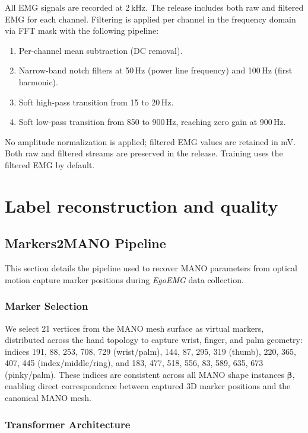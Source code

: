 \documentclass[letterpaper]{article} %
\newcommand{\dataset}{\textit{EgoEMG}}
\begin{document}
All EMG signals are recorded at 2\,kHz. The release includes both raw and filtered EMG for each channel. Filtering is applied per channel in the frequency domain via FFT mask with the following pipeline:
\begin{enumerate}[leftmargin=1.5em,nosep]
    \item Per-channel mean subtraction (DC removal).
    \item Narrow-band notch filters at 50\,Hz (power line frequency) and 100\,Hz (first harmonic).
    \item Soft high-pass transition from 15 to 20\,Hz.
    \item Soft low-pass transition from 850 to 900\,Hz, reaching zero gain at
    900\,Hz.
\end{enumerate}
No amplitude normalization is applied; filtered EMG values are retained in mV. Both raw and filtered streams are preserved in the release. Training uses the filtered EMG by default.

\FloatBarrier
\section{Label reconstruction and quality}
\label{app:label_validation}

\subsection{Markers2MANO Pipeline}
\label{app:markers2mano}

This section details the pipeline used to recover MANO parameters from optical motion capture marker positions during \dataset{} data collection.

\subsubsection{Marker Selection}

We select 21 vertices from the MANO mesh surface as virtual markers, distributed across the hand topology to capture wrist, finger, and palm geometry: indices 191, 88, 253, 708, 729 (wrist/palm), 144, 87, 295, 319 (thumb), 220, 365, 407, 445 (index/middle/ring), and 183, 477, 518, 556, 83, 589, 635, 673 (pinky/palm). These indices are consistent across all MANO shape instances $\boldsymbol{\beta}$, enabling direct correspondence between captured 3D marker positions and the canonical MANO mesh.

\subsubsection{Transformer Architecture}
\end{document}
